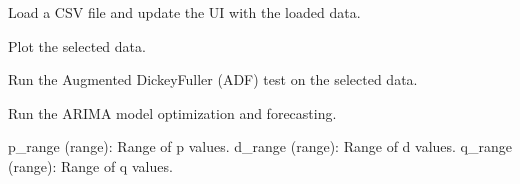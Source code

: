 \documentclass[letterpaper,10pt,english]{sphinxmanual}
\begin{document}
\begin{fulllineitems}

\begin{fulllineitems}
\label{\detokenize{Mainwindow:Mainwindow.MainWindow.load_file}}
\pysigstartsignatures
{}
\pysigstopsignatures
\sphinxAtStartPar
Load a CSV file and update the UI with the loaded data.

\end{fulllineitems}


\begin{fulllineitems}
\label{\detokenize{Mainwindow:Mainwindow.MainWindow.plot_selected_data}}
\pysigstartsignatures
{}
\pysigstopsignatures
\sphinxAtStartPar
Plot the selected data.

\end{fulllineitems}


\begin{fulllineitems}
\label{\detokenize{Mainwindow:Mainwindow.MainWindow.run_adf_test}}
\pysigstartsignatures
{}
\pysigstopsignatures
\sphinxAtStartPar
Run the Augmented Dickey\sphinxhyphen{}Fuller (ADF) test on the selected data.

\end{fulllineitems}


\begin{fulllineitems}
\label{\detokenize{Mainwindow:Mainwindow.MainWindow.run_arima}}
\pysigstartsignatures
{}
\pysigstopsignatures
\sphinxAtStartPar
Run the ARIMA model optimization and forecasting.
\begin{description}
\sphinxAtStartPar
p\_range (range): Range of p values.
d\_range (range): Range of d values.
q\_range (range): Range of q values.


\end{description}
\end{fulllineitems}
\end{fulllineitems}
\end{document}
